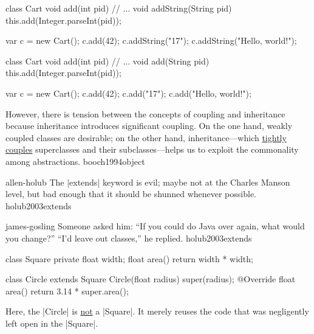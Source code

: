 \documentclass{article}
\begin{document}
\begin{pptWide}{2}
{\small\begin{ffcode}
class Cart {
  void add(int pid) // ...
  void addString(String pid) {
    this.add(Integer.parseInt(pid));
  }
}

var c = new Cart();
c.add(42);
c.addString("17");
c.addString("Hello, world!");
\end{ffcode}
}
\par\columnbreak\par
{\small\begin{ffcode}
class Cart {
  void add(int pid) // ...
  void add(String pid) {
    this.add(Integer.parseInt(pid));
  }
}

var c = new Cart();
c.add(42);
c.add("17");
c.add("Hello, world!");
\end{ffcode}
}
\end{pptWide}
\plush{}


  {However, there is tension between the concepts of coupling and inheritance because inheritance introduces significant coupling. On the one hand, weakly coupled classes are desirable; on the other hand, inheritance---which \ul{tightly couples} superclasses and their subclasses---helps us to exploit the commonality among abstractions.}
  {booch1994object}

\lnQuote
  {allen-holub}
  {The |extends| keyword is evil; maybe not at the Charles Manson level, but bad enough that it should be shunned whenever possible.}
  {holub2003extends}

\lnQuote
  {james-gosling}
  {Someone asked him: ``If you could do Java over again, what would you change?'' ``I'd leave out classes,'' he replied.}
  {holub2003extends}

\begin{pptWide}{2}
{\small\begin{ffcode}
class Square
  private float width;
  float area()
    return width * width;

class Circle extends Square
  Circle(float radius)
    super(radius);
  @Override float area()
    return 3.14 * super.area();
\end{ffcode}
}
\par\columnbreak\par
{}
\par
Here, the |Circle| is \ul{not} a |Square|.
It merely reuses the code that was negligently left open in the |Square|.
\end{pptWide}
\plush{}
\end{document}
